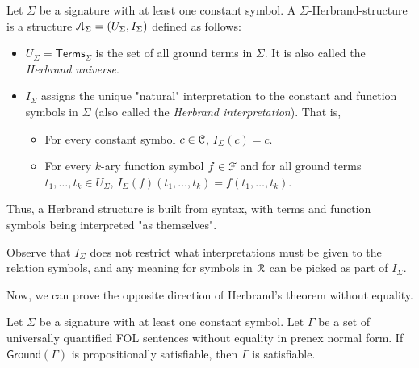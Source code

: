 \documentclass[11pt,usenames, dvipsnames]{article}
\begin{document}
\begin{definition}
  Let $\Sigma$ be a signature with at least one constant symbol. A $\Sigma$-Herbrand-structure is a structure $\struct_\Sigma = (U_\Sigma, I_\Sigma)$ defined as follows:
  \begin{itemize}
    \item $U_\Sigma = \mathsf{Terms}_\Sigma$ is the set of all ground terms in $\Sigma$. It is also called the \emph{Herbrand universe}.
    \item $I_\Sigma$ assigns the unique "natural" interpretation to the constant and function symbols in $\Sigma$ (also called the \emph{Herbrand interpretation}). That is,
    \begin{itemize}
      \item For every constant symbol $c \in \conn$, $I_\Sigma(c) = c$.
      \item For every $k$-ary function symbol $f \in \func$ and for all ground terms $t_1, \ldots, t_k \in U_\Sigma$, $I_\Sigma(f)(t_1, \ldots, t_k) = f(t_1, \ldots, t_k)$.
    \end{itemize}
  \end{itemize}

  Thus, a Herbrand structure is built from syntax, with terms and function symbols being interpreted "as themselves".

  Observe that $I_\Sigma$ does not restrict what interpretations must be given to the relation symbols, and any meaning for symbols in $\reln$ can be picked as part of $I_\Sigma$.
\end{definition}

Now, we can prove the opposite direction of Herbrand's theorem without equality.

\begin{lemma}
  Let $\Sigma$ be a signature with at least one constant symbol. Let $\Gamma$ be a set of universally quantified FOL sentences without equality in prenex normal form. If $\mathsf{Ground}(\Gamma)$ is propositionally satisfiable, then $\Gamma$ is satisfiable.
\end{lemma}
\end{document}
